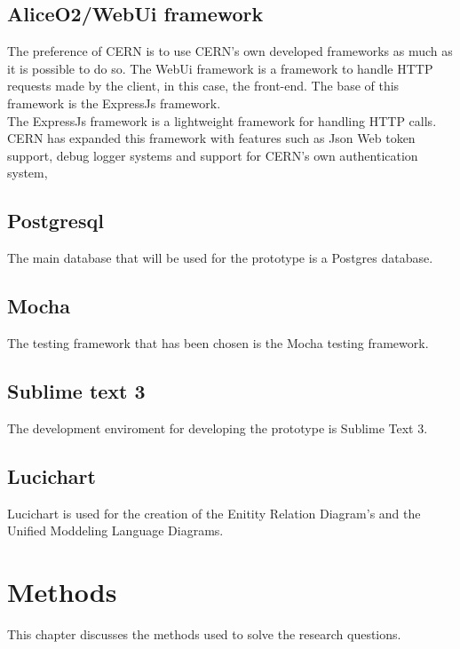 \documentclass[paper=a4, fontsize=11pt,twoside]{scrartcl}	%
\begin{document}
\subsection{AliceO2/WebUi framework}
The preference of CERN is to use CERN's own developed frameworks as much as it is possible to do so. The WebUi framework is a framework to handle HTTP requests made by the client, in this case, the front-end. The base of this framework is the ExpressJs framework. \\
The ExpressJs framework is a lightweight framework for handling HTTP calls. CERN has expanded this framework with features such as Json Web token support, debug logger systems and support for CERN's own authentication system,

\subsection{Postgresql}
The main database that will be used for the prototype is a Postgres database. 

\subsection{Mocha}
The testing framework that has been chosen is the Mocha testing framework.

\subsection{Sublime text 3}
The development enviroment for developing the prototype is Sublime Text 3.

\subsection{Lucichart}
Lucichart is used for the creation of the Enitity Relation Diagram's and the Unified Moddeling Language Diagrams.

\newpage


\section{Methods}
This chapter discusses the methods used to solve the research questions.
\end{document}
